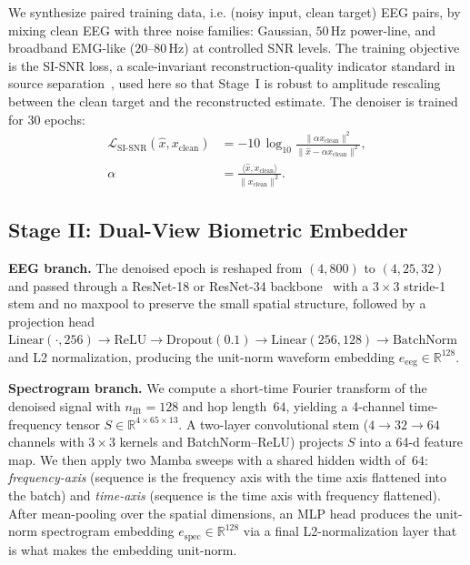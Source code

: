 \documentclass{IEEEtran}
\begin{document}
We synthesize paired training data, i.e. (noisy input, clean target) EEG
pairs, by mixing clean EEG with three noise families: Gaussian, $50$\,Hz
power-line, and broadband EMG-like ($20$--$80$\,Hz) at controlled SNR
levels. The training objective is the SI-SNR loss, a scale-invariant
reconstruction-quality indicator standard in source separation~\cite{b10},
used here so that Stage~I is robust to amplitude rescaling between the
clean target and the reconstructed estimate. The denoiser is trained for
$30$ epochs:
\begin{equation}
\label{eq:sisnr}
\begin{aligned}
\mathcal{L}_{\mathrm{SI\text{-}SNR}}(\hat{x},x_{\mathrm{clean}})
&= -10\,\log_{10}\!\frac{\|\alpha x_{\mathrm{clean}}\|^{2}}
{\|\hat{x}-\alpha x_{\mathrm{clean}}\|^{2}},\\
\alpha &= \frac{\langle \hat{x}, x_{\mathrm{clean}}\rangle}
{\|x_{\mathrm{clean}}\|^{2}}.
\end{aligned}
\end{equation}

\subsection{Stage II: Dual-View Biometric Embedder}
\textbf{EEG branch.} The denoised epoch is reshaped from $(4,800)$ to
$(4,25,32)$ and passed through a ResNet-18 or ResNet-34
backbone~\cite{b5} with a $3{\times}3$ stride-1 stem and no maxpool to
preserve the small spatial structure, followed by a projection head
$\text{Linear}(\cdot,256)\to\text{ReLU}\to\text{Dropout}(0.1)
\to\text{Linear}(256,128)\to\text{BatchNorm}$ and L2 normalization,
producing the unit-norm waveform embedding
$e_{\mathrm{eeg}}\in\mathbb{R}^{128}$.

\textbf{Spectrogram branch.} We compute a short-time Fourier transform of
the denoised signal with $n_{\mathrm{fft}}=128$ and hop length~$64$,
yielding a 4-channel time-frequency tensor
$S\in\mathbb{R}^{4\times 65\times 13}$. A two-layer convolutional stem
($4{\to}32{\to}64$ channels with $3{\times}3$ kernels and BatchNorm--ReLU)
projects $S$ into a 64-d feature map. We then apply two Mamba sweeps with
a shared hidden width of~$64$: \emph{frequency-axis} (sequence is the
frequency axis with the time axis flattened into the batch) and
\emph{time-axis} (sequence is the time axis with frequency flattened).
After mean-pooling over the spatial dimensions, an MLP head produces the
unit-norm spectrogram embedding $e_{\mathrm{spec}}\in\mathbb{R}^{128}$
via a final L2-normalization layer that is what makes the embedding
unit-norm.
\end{document}
